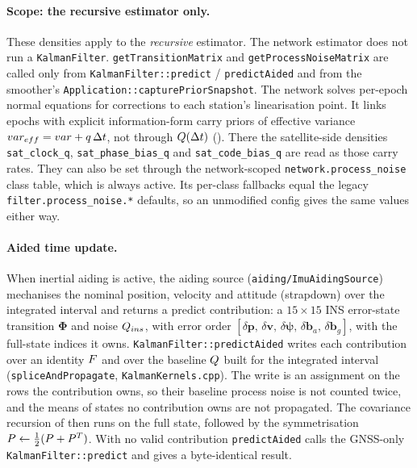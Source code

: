 \documentclass[main.tex]{subfiles}
\begin{document}
\paragraph{Scope: the recursive estimator only.}
These densities apply to the \emph{recursive} estimator.  The network
estimator does not run a \texttt{KalmanFilter}.
\texttt{getTransitionMatrix} and \texttt{getProcessNoiseMatrix} are
called only from \texttt{KalmanFilter::predict} /
\texttt{predictAided} and from the smoother's
\texttt{Application::capturePriorSnapshot}.  The network solves
per-epoch normal equations for corrections to each station's
linearisation point.  It links epochs with explicit information-form
carry priors of effective variance
$var_{eff} = var + q\,\Delta t$, not through
$Q(\Delta t)$ ().  There the
satellite-side densities \texttt{sat\_clock\_q},
\texttt{sat\_phase\_bias\_q} and \texttt{sat\_code\_bias\_q} are read as
those carry rates.  They can also be set through the network-scoped
\texttt{network.process\_noise} class table, which is always active.  Its
per-class fallbacks equal the legacy \texttt{filter.process\_noise.*}
defaults, so an unmodified config gives the same values either way.

\paragraph{Aided time update.}
When inertial aiding is active, the aiding source
(\texttt{aiding/ImuAidingSource}) mechanises the nominal position, velocity
and attitude (strapdown) over the integrated interval and returns a predict
contribution: a $15\times15$ INS error-state transition $\bm{\Phi}$ and noise
$Q_{ins}$, with error order
$[\delta\bm{p},\,\delta\bm{v},\,\delta\bm{\psi},\,\delta\bm{b}_a,\,
\delta\bm{b}_g]$, with the full-state indices it owns.
\texttt{KalmanFilter::predictAided} writes each contribution over an identity
$F$ and over the baseline $Q$ built for the integrated interval
(\texttt{spliceAndPropagate}, \texttt{KalmanKernels.cpp}).  The write is an
assignment on the rows the contribution owns, so their baseline process noise
is not counted twice, and the means of states no contribution owns are not
propagated.  The covariance recursion of  then runs on the
full state, followed by the symmetrisation
$P \leftarrow \tfrac12(P + P^{T})$.  With no valid
contribution \texttt{predictAided} calls the GNSS-only
\texttt{KalmanFilter::predict} and gives a byte-identical result.
\end{document}
